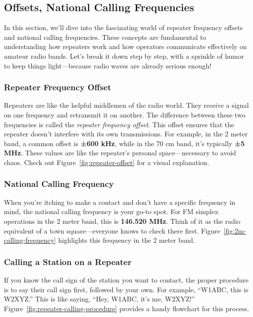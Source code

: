 \subsection{Offsets, National Calling Frequencies}
\label{subsec:offsets-national}

In this section, we’ll dive into the fascinating world of repeater frequency offsets and national calling frequencies. These concepts are fundamental to understanding how repeaters work and how operators communicate effectively on amateur radio bands. Let’s break it down step by step, with a sprinkle of humor to keep things light—because radio waves are already serious enough!

\subsubsection*{Repeater Frequency Offset}
Repeaters are like the helpful middlemen of the radio world. They receive a signal on one frequency and retransmit it on another. The difference between these two frequencies is called the \textit{repeater frequency offset}. This offset ensures that the repeater doesn’t interfere with its own transmissions. For example, in the 2 meter band, a common offset is \textbf{±600 kHz}, while in the 70 cm band, it’s typically \textbf{±5 MHz}. These values are like the repeater’s personal space—necessary to avoid chaos. Check out Figure~\ref{fig:repeater-offset} for a visual explanation.

\subsubsection*{National Calling Frequency}
When you’re itching to make a contact and don’t have a specific frequency in mind, the national calling frequency is your go-to spot. For FM simplex operations in the 2 meter band, this is \textbf{146.520 MHz}. Think of it as the radio equivalent of a town square—everyone knows to check there first. Figure~\ref{fig:2m-calling-frequency} highlights this frequency in the 2 meter band.

\subsubsection*{Calling a Station on a Repeater}
If you know the call sign of the station you want to contact, the proper procedure is to say their call sign first, followed by your own. For example, “W1ABC, this is W2XYZ.” This is like saying, “Hey, W1ABC, it’s me, W2XYZ!” Figure~\ref{fig:repeater-calling-procedure} provides a handy flowchart for this process.

